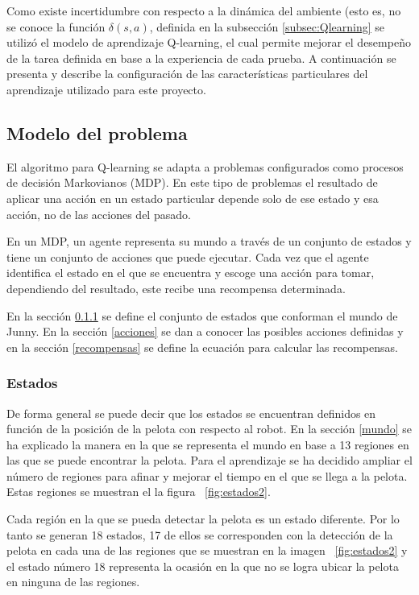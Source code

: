 Como existe incertidumbre con respecto a la dinámica del ambiente (esto es, no se conoce la función $\delta(s,a)$, definida en la subsección \ref{subsec:Qlearning} se utilizó el modelo de aprendizaje Q-learning, el cual permite mejorar el desempeño de la tarea definida en base a la experiencia de cada prueba. A continuación se presenta y describe la configuración de las caracter\'isticas particulares del aprendizaje utilizado para este proyecto.

\subsection{Modelo del problema}

El algoritmo para Q-learning se adapta a problemas configurados como procesos de decisión Markovianos (MDP). En este tipo de problemas el resultado de aplicar una acción en un estado particular depende solo de ese estado y esa acción, no de las acciones del pasado. 

En un MDP, un agente representa su mundo a través de un conjunto de estados y tiene un conjunto de acciones que puede ejecutar. Cada vez que el agente identifica el estado en el que se encuentra y escoge una acción para tomar, dependiendo del resultado, este recibe una recompensa determinada.

En la sección \ref{estados} se define el conjunto de estados que conforman el mundo de Junny. En la secci\'on \ref{acciones} se dan a conocer las posibles acciones definidas y en la secci\'on \ref{recompensas} se define la ecuaci\'on para calcular las recompensas.   

\subsubsection{Estados}\label{estados}

De forma general se puede decir que los estados se encuentran definidos en función de la posición de la pelota con respecto al robot. En la sección \ref{mundo} se ha explicado la manera en la que se representa el mundo en base a 13 regiones en las que se puede encontrar la pelota. Para el aprendizaje se ha decidido ampliar el número de regiones para afinar y mejorar el tiempo en el que se llega a la pelota. Estas regiones se muestran el la figura ~\ref{fig:estados2}.

Cada región en la que se pueda detectar la pelota es un estado diferente. Por lo tanto se generan 18 estados, 17 de ellos se corresponden con la detección de la pelota en cada una de las regiones que se muestran en la imagen ~\ref{fig:estados2} y el estado número 18 representa la ocasión en la que no se logra ubicar la pelota en ninguna de las regiones.  

